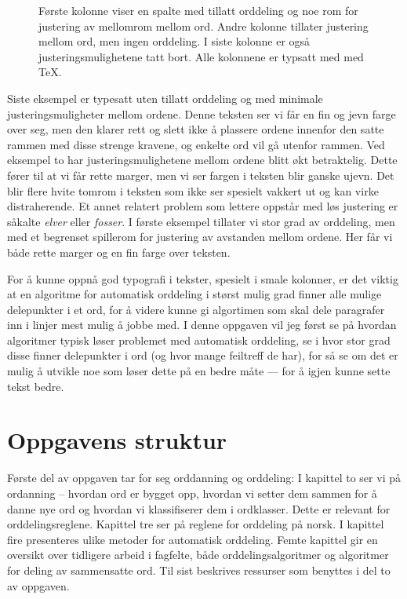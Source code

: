 \begin{figure}

\label{fig:three-columns}
\caption[Eksemepler på tekstsetting av smale kolonner]{Første kolonne viser en spalte med tillatt orddeling og noe rom for justering av mellomrom mellom ord. Andre kolonne tillater justering mellom ord, men ingen orddeling. I siste kolonne er også justeringsmulighetene tatt bort. Alle kolonnene er typsatt med med \TeX{}.}
\end{figure}

Siste eksempel er typesatt uten tillatt orddeling og med minimale justeringsmuligheter mellom ordene. Denne teksten ser vi får en fin og jevn farge over seg, men den klarer rett og slett ikke å plassere ordene innenfor den satte rammen med disse strenge kravene, og enkelte ord vil gå utenfor rammen. Ved eksempel to har justeringsmulighetene mellom ordene blitt økt betraktelig. Dette fører til at vi får rette marger, men vi ser fargen i teksten blir ganske ujevn. Det blir flere hvite tomrom i teksten som ikke ser spesielt vakkert ut og kan virke distraherende. Et annet relatert problem som lettere oppstår med løs justering er såkalte \textit{elver} eller \textit{fosser}.  I første eksempel tillater vi stor grad av orddeling, men med et begrenset spillerom for justering av avstanden mellom ordene. Her får vi både rette marger og en fin farge over teksten.

For å kunne oppnå god typografi i tekster, spesielt i smale kolonner, er det viktig at en algoritme for automatisk orddeling i størst mulig grad finner alle mulige delepunkter i et ord, for å videre kunne gi algortimen som skal dele paragrafer inn i linjer mest mulig å jobbe med. I denne oppgaven vil jeg først se på hvordan algoritmer typisk løser problemet med automatisk orddeling, se i hvor stor grad disse finner delepunkter i ord (og hvor mange feiltreff de har), for så se om det er mulig å utvikle noe som løser dette på en bedre måte — for å igjen kunne sette tekst bedre.

\section{Oppgavens struktur}

Første del av oppgaven tar for seg orddanning og orddeling: I kapittel to ser vi på ordanning -- hvordan ord er bygget opp, hvordan vi setter dem sammen for å danne nye ord og hvordan vi klassifiserer dem i ordklasser. Dette er relevant for orddelingsreglene. Kapittel tre ser på reglene for orddeling på norsk. I kapittel fire presenteres ulike metoder for automatisk orddeling. Femte kapittel gir en oversikt over tidligere arbeid i fagfelte, både orddelingsalgoritmer og algoritmer for deling av sammensatte ord. Til sist beskrives ressurser som benyttes i del to av oppgaven.

